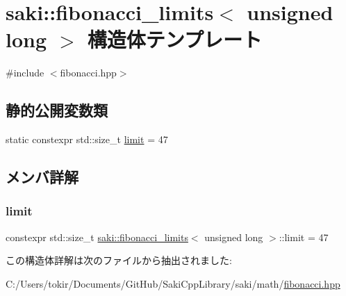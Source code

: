 \hypertarget{structsaki_1_1fibonacci__limits_3_01unsigned_01long_01_4}{}\section{saki\+:\+:fibonacci\+\_\+limits$<$ unsigned long $>$ 構造体テンプレート}
\label{structsaki_1_1fibonacci__limits_3_01unsigned_01long_01_4}


{\ttfamily \#include $<$fibonacci.\+hpp$>$}

\subsection*{静的公開変数類}
\begin{DoxyCompactItemize}
\item 
static constexpr std\+::size\+\_\+t \mbox{\hyperlink{structsaki_1_1fibonacci__limits_3_01unsigned_01long_01_4_ad77b6f0ac4e95c53aa88afa682993c98}{limit}} = 47
\end{DoxyCompactItemize}


\subsection{メンバ詳解}
\mbox{\label{structsaki_1_1fibonacci__limits_3_01unsigned_01long_01_4_ad77b6f0ac4e95c53aa88afa682993c98}} 
\subsubsection{\texorpdfstring{limit}{limit}}
{\footnotesize\ttfamily constexpr std\+::size\+\_\+t \mbox{\hyperlink{structsaki_1_1fibonacci__limits}{saki\+::fibonacci\+\_\+limits}}$<$ unsigned long $>$\+::limit = 47\hspace{0.3cm}{\ttfamily [static]}}



この構造体詳解は次のファイルから抽出されました\+:\begin{DoxyCompactItemize}
\item 
C\+:/\+Users/tokir/\+Documents/\+Git\+Hub/\+Saki\+Cpp\+Library/saki/math/\mbox{\hyperlink{fibonacci_8hpp}{fibonacci.\+hpp}}\end{DoxyCompactItemize}
